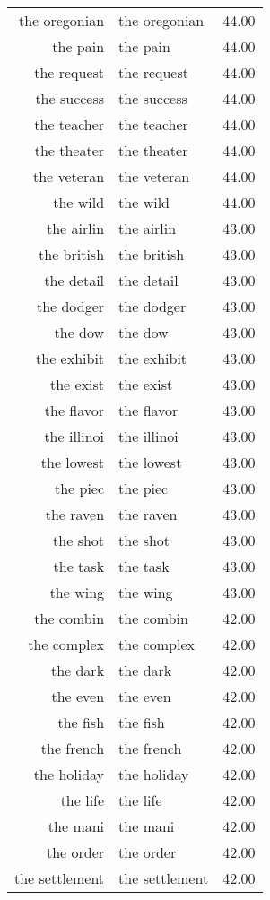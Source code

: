 \begin{table}[ht]
\begin{tabular}{rlr}
  the oregonian & the oregonian & 44.00 \\ 
  the pain & the pain & 44.00 \\ 
  the request & the request & 44.00 \\ 
  the success & the success & 44.00 \\ 
  the teacher & the teacher & 44.00 \\ 
  the theater & the theater & 44.00 \\ 
  the veteran & the veteran & 44.00 \\ 
  the wild & the wild & 44.00 \\ 
  the airlin & the airlin & 43.00 \\ 
  the british & the british & 43.00 \\ 
  the detail & the detail & 43.00 \\ 
  the dodger & the dodger & 43.00 \\ 
  the dow & the dow & 43.00 \\ 
  the exhibit & the exhibit & 43.00 \\ 
  the exist & the exist & 43.00 \\ 
  the flavor & the flavor & 43.00 \\ 
  the illinoi & the illinoi & 43.00 \\ 
  the lowest & the lowest & 43.00 \\ 
  the piec & the piec & 43.00 \\ 
  the raven & the raven & 43.00 \\ 
  the shot & the shot & 43.00 \\ 
  the task & the task & 43.00 \\ 
  the wing & the wing & 43.00 \\ 
  the combin & the combin & 42.00 \\ 
  the complex & the complex & 42.00 \\ 
  the dark & the dark & 42.00 \\ 
  the even & the even & 42.00 \\ 
  the fish & the fish & 42.00 \\ 
  the french & the french & 42.00 \\ 
  the holiday & the holiday & 42.00 \\ 
  the life & the life & 42.00 \\ 
  the mani & the mani & 42.00 \\ 
  the order & the order & 42.00 \\ 
  the settlement & the settlement & 42.00 \\ 

\end{tabular}
\end{table}
